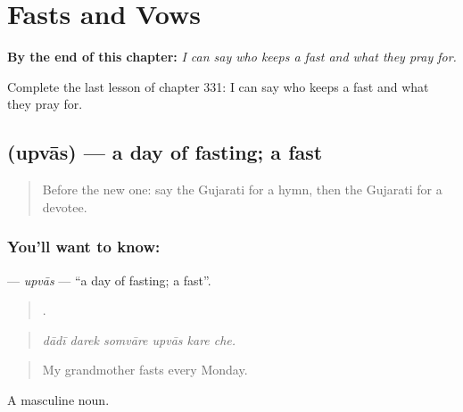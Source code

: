 
\chapter{Fasts and Vows}
\label{ch:gu-fasts-and-vows}

\begin{chapteropening}
\textbf{By the end of this chapter:} \emph{I can say who keeps a fast and what they pray for.}

Complete the last lesson of chapter 331: I can say who keeps a fast and what they pray for.
\end{chapteropening}

\section[\texorpdfstring{\gu{ઉપવાસ} (upvās)}{ઉપવાસ (upvās)}]{ (upvās) — a day of fasting; a fast}

\label{lesson:GU-C331-upvas}



\begin{quote}
Before the new one: say the Gujarati for a hymn, then the Gujarati for a devotee.
\end{quote}

\subsection*{You'll want to know: }
\textbf{} — \emph{upvās} — \textquotedblleft{}a day of fasting; a fast\textquotedblright{}.

\begin{quote}
     .
\end{quote}

\begin{quote}
\emph{dādī darek somvāre upvās kare che.}
\end{quote}

\begin{quote}
My grandmother fasts every Monday.
\end{quote}

A masculine noun.

